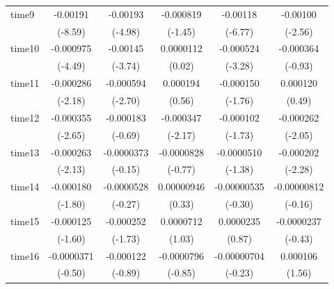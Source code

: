 \begin{table}[htbp]
\begin{tabular}{l*{5}{c}}
time9       &    -0.00191\sym{***}&    -0.00193\sym{***}&   -0.000819         &    -0.00118\sym{***}&    -0.00100\sym{*}  \\
            &     (-8.59)         &     (-4.98)         &     (-1.45)         &     (-6.77)         &     (-2.56)         \\
time10      &   -0.000975\sym{***}&    -0.00145\sym{***}&   0.0000112         &   -0.000524\sym{**} &   -0.000364         \\
            &     (-4.49)         &     (-3.74)         &      (0.02)         &     (-3.28)         &     (-0.93)         \\
time11      &   -0.000286\sym{*}  &   -0.000594\sym{**} &    0.000194         &   -0.000150         &    0.000120         \\
            &     (-2.18)         &     (-2.70)         &      (0.56)         &     (-1.76)         &      (0.49)         \\
time12      &   -0.000355\sym{**} &   -0.000183         &   -0.000347\sym{*}  &   -0.000102         &   -0.000262\sym{*}  \\
            &     (-2.65)         &     (-0.69)         &     (-2.17)         &     (-1.73)         &     (-2.05)         \\
time13      &   -0.000263\sym{*}  &  -0.0000373         &  -0.0000828         &  -0.0000510         &   -0.000202\sym{*}  \\
            &     (-2.13)         &     (-0.15)         &     (-0.77)         &     (-1.38)         &     (-2.28)         \\
time14      &   -0.000180         &  -0.0000528         &  0.00000946         & -0.00000535         & -0.00000812         \\
            &     (-1.80)         &     (-0.27)         &      (0.33)         &     (-0.30)         &     (-0.16)         \\
time15      &   -0.000125         &   -0.000252         &   0.0000712         &   0.0000235         &  -0.0000237         \\
            &     (-1.60)         &     (-1.73)         &      (1.03)         &      (0.87)         &     (-0.43)         \\
time16      &  -0.0000371         &   -0.000122         &  -0.0000796         & -0.00000704         &    0.000106         \\
            &     (-0.50)         &     (-0.89)         &     (-0.85)         &     (-0.23)         &      (1.56)         \\

\end{tabular}
\end{table}
